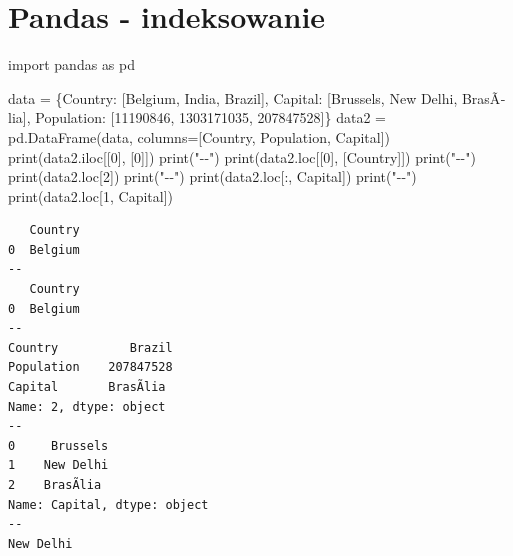 \documentclass[
  polish,
  letterpaper,
  DIV=11,
  numbers=noendperiod]{scrreprt}
\newenvironment{Shaded}{\begin{snugshade}}{\end{snugshade}}
\newcommand{\BuiltInTok}[1]{\textcolor[rgb]{0.00,0.23,0.31}{#1}}
\newcommand{\DecValTok}[1]{\textcolor[rgb]{0.68,0.00,0.00}{#1}}
\newcommand{\ImportTok}[1]{\textcolor[rgb]{0.00,0.46,0.62}{#1}}
\newcommand{\NormalTok}[1]{\textcolor[rgb]{0.00,0.23,0.31}{#1}}
\newcommand{\OperatorTok}[1]{\textcolor[rgb]{0.37,0.37,0.37}{#1}}
\newcommand{\StringTok}[1]{\textcolor[rgb]{0.13,0.47,0.30}{#1}}
\begin{document}
\chapter{Pandas - indeksowanie}\label{pandas---indeksowanie}

\begin{Shaded}
\begin{Highlighting}[]
\ImportTok{import}\NormalTok{ pandas }\ImportTok{as}\NormalTok{ pd}

\NormalTok{data }\OperatorTok{=}\NormalTok{ \{}\StringTok{\textquotesingle{}Country\textquotesingle{}}\NormalTok{: [}\StringTok{\textquotesingle{}Belgium\textquotesingle{}}\NormalTok{, }\StringTok{\textquotesingle{}India\textquotesingle{}}\NormalTok{, }\StringTok{\textquotesingle{}Brazil\textquotesingle{}}\NormalTok{],}
        \StringTok{\textquotesingle{}Capital\textquotesingle{}}\NormalTok{: [}\StringTok{\textquotesingle{}Brussels\textquotesingle{}}\NormalTok{, }\StringTok{\textquotesingle{}New Delhi\textquotesingle{}}\NormalTok{, }\StringTok{\textquotesingle{}BrasÃ­lia\textquotesingle{}}\NormalTok{],}
        \StringTok{\textquotesingle{}Population\textquotesingle{}}\NormalTok{: [}\DecValTok{11190846}\NormalTok{, }\DecValTok{1303171035}\NormalTok{, }\DecValTok{207847528}\NormalTok{]\}}
\NormalTok{data2 }\OperatorTok{=}\NormalTok{ pd.DataFrame(data, columns}\OperatorTok{=}\NormalTok{[}\StringTok{\textquotesingle{}Country\textquotesingle{}}\NormalTok{, }\StringTok{\textquotesingle{}Population\textquotesingle{}}\NormalTok{, }\StringTok{\textquotesingle{}Capital\textquotesingle{}}\NormalTok{])}
\BuiltInTok{print}\NormalTok{(data2.iloc[[}\DecValTok{0}\NormalTok{], [}\DecValTok{0}\NormalTok{]])}
\BuiltInTok{print}\NormalTok{(}\StringTok{"{-}{-}"}\NormalTok{)}
\BuiltInTok{print}\NormalTok{(data2.loc[[}\DecValTok{0}\NormalTok{], [}\StringTok{\textquotesingle{}Country\textquotesingle{}}\NormalTok{]])}
\BuiltInTok{print}\NormalTok{(}\StringTok{"{-}{-}"}\NormalTok{)}
\BuiltInTok{print}\NormalTok{(data2.loc[}\DecValTok{2}\NormalTok{])}
\BuiltInTok{print}\NormalTok{(}\StringTok{"{-}{-}"}\NormalTok{)}
\BuiltInTok{print}\NormalTok{(data2.loc[:, }\StringTok{\textquotesingle{}Capital\textquotesingle{}}\NormalTok{])}
\BuiltInTok{print}\NormalTok{(}\StringTok{"{-}{-}"}\NormalTok{)}
\BuiltInTok{print}\NormalTok{(data2.loc[}\DecValTok{1}\NormalTok{, }\StringTok{\textquotesingle{}Capital\textquotesingle{}}\NormalTok{])}
\end{Highlighting}
\end{Shaded}

\begin{verbatim}
   Country
0  Belgium
--
   Country
0  Belgium
--
Country          Brazil
Population    207847528
Capital       BrasÃ­lia
Name: 2, dtype: object
--
0     Brussels
1    New Delhi
2    BrasÃ­lia
Name: Capital, dtype: object
--
New Delhi
\end{verbatim}
\end{document}
